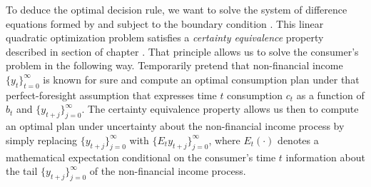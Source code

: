  To deduce the optimal decision rule, we want to solve the system
of difference equations formed by  and  
subject to the boundary condition . 
This linear quadratic
optimization problem satisfies a {\it certainty equivalence\/} property described in 
section  of  chapter . That principle allows us to solve the consumer's
problem in the following way.
%
 Temporarily  pretend that non-financial income $\{y_t\}_{t=0}^\infty$ is known for sure 
and compute an optimal consumption plan under that perfect-foresight assumption that expresses time $t$ consumption $c_t$ as a function of 
$b_t$ and $\{y_{t+j}\}_{j=0}^\infty$. The certainty equivalence property allows us then to  compute an optimal plan under uncertainty about the non-financial
income process by simply replacing  $\{y_{t+j}\}_{j=0}^\infty$ %
 with  $\{E_t y_{t+j}\}_{j=0}^\infty$, where $E_t(\cdot)$ denotes a mathematical 
expectation conditional on the consumer's time $t$ information about the tail $\{y_{t+j}\}_{j=0}^\infty$
of the non-financial income process.

